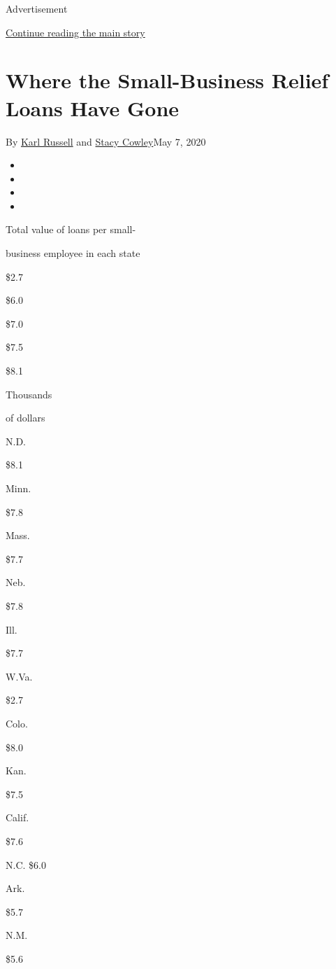Advertisement

\protect\hyperlink{after-top}{Continue reading the main story}

\hypertarget{where-the-small-business-relief-loans-have-gone}{%
\section{Where the Small-Business Relief Loans Have
Gone}\label{where-the-small-business-relief-loans-have-gone}}

By \href{https://www.nytimes3xbfgragh.onion/by/karl-russell}{Karl
Russell} and
\href{https://www.nytimes3xbfgragh.onion/by/stacy-cowley}{Stacy
Cowley}May 7, 2020

\begin{itemize}
\item
\item
\item
\item
\end{itemize}

Total value of loans per small-

business employee in each state

\$2.7

\$6.0

\$7.0

\$7.5

\$8.1

Thousands

of dollars

N.D.

\$8.1

Minn.

\$7.8

Mass.

\$7.7

Neb.

\$7.8

Ill.

\$7.7

W.Va.

\$2.7

Colo.

\$8.0

Kan.

\$7.5

Calif.

\$7.6

N.C. \$6.0

Ark.

\$5.7

N.M.

\$5.6


